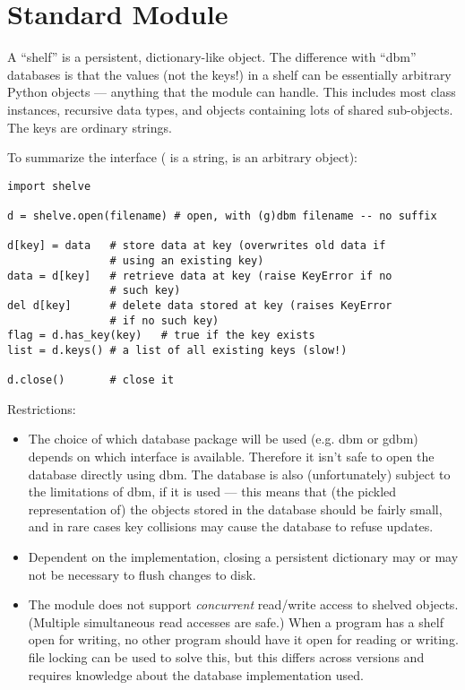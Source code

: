 \section{Standard Module }
\label{module-shelve}

A ``shelf'' is a persistent, dictionary-like object.  The difference
with ``dbm'' databases is that the values (not the keys!) in a shelf
can be essentially arbitrary Python objects --- anything that the
 module can handle.  This includes most class instances,
recursive data types, and objects containing lots of shared
sub-objects.  The keys are ordinary strings.

To summarize the interface ( is a string,  is an
arbitrary object):

\bcode\begin{verbatim}
import shelve

d = shelve.open(filename) # open, with (g)dbm filename -- no suffix

d[key] = data   # store data at key (overwrites old data if
                # using an existing key)
data = d[key]   # retrieve data at key (raise KeyError if no
                # such key)
del d[key]      # delete data stored at key (raises KeyError
                # if no such key)
flag = d.has_key(key)   # true if the key exists
list = d.keys() # a list of all existing keys (slow!)

d.close()       # close it
\end{verbatim}\ecode
%
Restrictions:

\begin{itemize}

\item
The choice of which database package will be used (e.g. dbm or gdbm)
depends on which interface is available.  Therefore it isn't safe to
open the database directly using dbm.  The database is also
(unfortunately) subject to the limitations of dbm, if it is used ---
this means that (the pickled representation of) the objects stored in
the database should be fairly small, and in rare cases key collisions
may cause the database to refuse updates.

\item
Dependent on the implementation, closing a persistent dictionary may
or may not be necessary to flush changes to disk.

\item
The  module does not support {\em concurrent} read/write
access to shelved objects.  (Multiple simultaneous read accesses are
safe.)  When a program has a shelf open for writing, no other program
should have it open for reading or writing.  \UNIX{} file locking can
be used to solve this, but this differs across \UNIX{} versions and
requires knowledge about the database implementation used.

\end{itemize}
